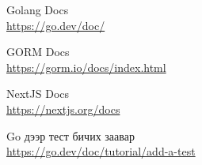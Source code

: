 
\singlespace
{}
\begin{thebibliography}{99}
	Golang Docs
	\\\url{https://go.dev/doc/}

	GORM Docs
	\\\url{https://gorm.io/docs/index.html}

	NextJS Docs
	\\\url{https://nextjs.org/docs}

	Go дээр тест бичих заавар
	\\\url{https://go.dev/doc/tutorial/add-a-test}
\end{thebibliography}
